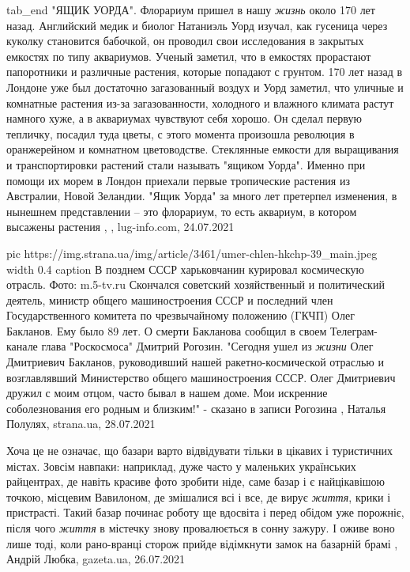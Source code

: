   tab_end
\fi
"ЯЩИК УОРДА". Флорариум пришел в нашу \emph{жизнь} около 170 лет назад. Английский
медик и биолог Натаниэль Уорд изучал, как гусеница через куколку становится
бабочкой, он проводил свои исследования в закрытых емкостях по типу аквариумов.
Ученый заметил, что в емкостях прорастают папоротники и различные растения,
которые попадают с грунтом. 170 лет назад в Лондоне уже был достаточно
загазованный воздух и Уорд заметил, что уличные и комнатные растения из-за
загазованности, холодного и влажного климата растут намного хуже, а в
аквариумах чувствуют себя хорошо. Он сделал первую тепличку, посадил туда
цветы, с этого момента произошла революция в оранжерейном и комнатном
цветоводстве. Стеклянные емкости для выращивания и транспортировки растений
стали называть "ящиком Уорда". Именно при помощи их морем в Лондон приехали
первые тропические растения из Австралии, Новой Зеландии. "Ящик Уорда" за много
лет претерпел изменения, в нынешнем представлении – это флорариум, то есть
аквариум, в котором высажены растения
, 
, lug-info.com, 24.07.2021

\ifcmt
  pic https://img.strana.ua/img/article/3461/umer-chlen-hkchp-39_main.jpeg
  width 0.4
	caption В позднем СССР харьковчанин курировал космическую отрасль. Фото: m.5-tv.ru 
\fi
Скончался советский хозяйственный и политический деятель, министр общего
машиностроения СССР и последний член Государственного комитета по чрезвычайному
положению (ГКЧП) Олег Бакланов. Ему было 89 лет.  О смерти Бакланова сообщил в
своем Телеграм-канале глава "Роскосмоса" Дмитрий Рогозин.  "Сегодня ушел из
\emph{жизни} Олег Дмитриевич Бакланов, руководивший нашей ракетно-космической
отраслью и возглавлявший Министерство общего машиностроения СССР. Олег
Дмитриевич дружил с моим отцом, часто бывал в нашем доме. Мои искренние
соболезнования его родным и близким!" - сказано в записи Рогозина
, 
Наталья Полулях, strana.ua, 28.07.2021

Хоча це не означає, що базари варто відвідувати тільки в цікавих і туристичних
містах. Зовсім навпаки: наприклад, дуже часто у маленьких українських
райцентрах, де навіть красиве фото зробити ніде, саме базар і є найцікавішою
точкою, місцевим Вавилоном, де змішалися всі і все, де вирує \emph{життя}, крики і
пристрасті. Такий базар починає роботу ще вдосвіта і перед обідом уже порожніє,
після чого \emph{життя} в містечку знову провалюється в сонну зажуру. І оживе воно
лише тоді, коли рано-вранці сторож прийде відімкнути замок на базарній брамі
, 
Андрій Любка, gazeta.ua, 26.07.2021

